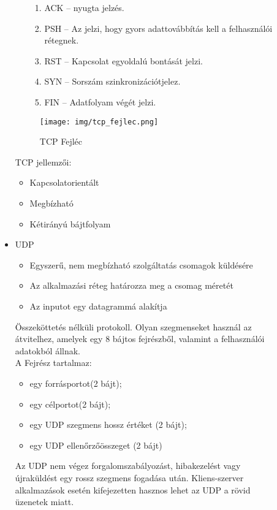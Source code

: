 \documentclass[margin=0px]{article}
\begin{document}
\begin{description}
\begin{itemize}
\begin{itemize}
\begin{enumerate}
                                \item ACK – nyugta jelzés.
                                \item PSH – Az jelzi, hogy gyors adattovábbítás kell a felhasználói rétegnek.
                                \item RST – Kapcsolat egyoldalú bontását jelzi.
                                \item SYN – Sorszám szinkronizációtjelez.
                                \item FIN – Adatfolyam végét jelzi.
                            \end{enumerate}
                  \end{itemize}
                  \begin{figure}[H]
                      \centering
                      \texttt{[image: img/tcp\_fejlec.png]}
                      \caption{TCP Fejléc}
                  \end{figure}
                  TCP jellemzői:
                  \begin{itemize}
                      \item Kapcsolatorientált
                      \item Megbízható
                      \item Kétirányú bájtfolyam
                  \end{itemize}
            \item UDP
                  \begin{itemize}
                      \item Egyszerű, nem megbízható szolgáltatás csomagok küldésére
                      \item Az alkalmazási réteg határozza meg a csomag méretét
                      \item Az inputot egy datagrammá alakítja
                  \end{itemize}
                  Összeköttetés nélküli protokoll. Olyan szegmenseket használ az átvitelhez, amelyek egy 8 bájtos fejrészből, valamint a felhasználói adatokból állnak.\\
                  A Fejrész tartalmaz:
                  \begin{itemize}
                      \item egy forrásportot(2 bájt);
                      \item egy célportot(2 bájt);
                      \item egy UDP szegmens hossz értéket (2 bájt);
                      \item egy UDP ellenőrzőösszeget (2 bájt)
                  \end{itemize}
                  Az UDP nem végez forgalomszabályozást, hibakezelést vagy újraküldést egy rossz szegmens fogadása után. Kliens-szerver alkalmazások esetén kifejezetten hasznos lehet az UDP a rövid üzenetek miatt.
        \end{itemize}
\end{description}
\end{document}

